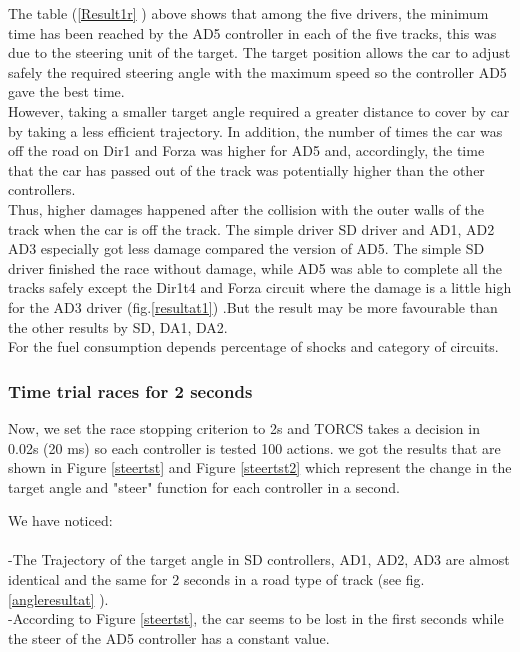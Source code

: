 \documentclass{llncs}
\begin{document}
The table (\ref{Result1r} ) above shows that among the five drivers, the minimum time has been reached by the AD5 controller in each of the five tracks, this was due to the steering unit of the target. The target position allows the car to adjust safely the required steering angle  with the maximum speed so the controller AD5 gave the best time.
\\
However, taking a smaller target angle required a greater distance to cover by car by taking a less efficient trajectory. In addition, the number of times the car was off the road on Dir1 and Forza was higher for AD5 and, accordingly, the time that the car has passed out of the track was potentially higher than the other controllers.
\\	

Thus, higher damages happened after the collision with the outer walls of the track when the car is off the track. The simple driver SD driver and AD1, AD2 AD3 especially got less damage compared the version of AD5. The simple SD driver finished the race without damage, while AD5 was able to complete all the tracks safely except the Dir1t4 and Forza circuit where the damage is a little high for the AD3 driver (fig.\ref{resultat1}) .But the result may be more favourable than the other results by SD, DA1, DA2.\\
For the fuel consumption depends percentage of shocks and category of circuits.

\subsubsection{Time trial races for 2 seconds}

Now, we set the race stopping criterion to 2s and TORCS takes a decision in 0.02s (20 ms) so each controller is tested 100 actions.
we got the results that are shown in Figure \ref{steertst}  and Figure \ref{steertst2}  which represent the change in the target angle and "steer" function for each controller in a second.



We have noticed:\\\\
-The Trajectory of the target angle in SD controllers, AD1, AD2, AD3 are almost identical and the same for 2 seconds in a road type of track (see fig. \ref{angleresultat} ).\\
-According to Figure \ref{steertst},  the car seems to be lost in the first seconds while  the steer of the AD5 controller has a constant value. \\
\end{document}
